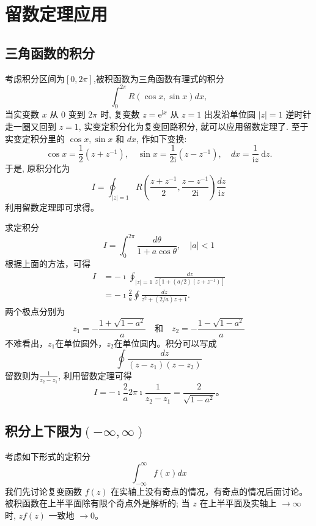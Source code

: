 \section{留数定理应用}
\subsection{三角函数的积分}
考虑积分区间为$\left[ 0, 2\pi \right]$,被积函数为三角函数有理式的积分
\begin{equation}
    \int_{0}^{2\pi} R(\cos{x}, \sin{x}) dx,
\end{equation}
当实变数 $x$ 从 0 变到 $2 \pi$ 时, 复变数 $z=\mathrm{e}^{\mathrm{i} x}$ 从 $z=1$ 出发沿单位圆 $|z|=1$ 逆时针 走一圈又回到 $z=1$,
实变定积分化为复变回路积分, 就可以应用留数定理了. 至于实变定积分里的 $\cos x, \sin x$ 和 $d x$, 作如下变换:
$$
\cos x=\frac{1}{2}\left(z+z^{-1}\right), \quad \sin x=\frac{1}{2 \mathrm{i}}\left(z-z^{-1}\right), \quad d x=\frac{1}{\mathrm{i} z} \mathrm{~d} z .
$$
于是, 原积分化为
$$
I=\oint_{|z|=1} R\left(\frac{z+z^{-1}}{2}, \frac{z-z^{-1}}{2 \mathrm{i}}\right) \frac{d z}{\mathrm{i} z}
$$
利用留数定理即可求得。

\begin{examplebox}{求定积分\[I=\int_0^{2 \pi} \frac{d \theta}{1+a \cos \theta}, \quad|a|<1 \]}
    根据上面的方法，可得
    \[
        \begin{aligned}
        I & =-\imath \oint_{|z|=1} \frac{d z}{z\left[1+(a / 2)\left(z+z^{-1}\right)\right]} \\
        & =-\imath \frac{2}{a} \oint \frac{d z}{z^2+(2 / a) z+1} .
        \end{aligned}
    \]
    两个极点分别为
    \[
        z_1=-\frac{1+\sqrt{1-a^2}}{a} \quad \text {和} \quad z_2=-\frac{1-\sqrt{1-a^2}}{a}
    \]
    不难看出，$z_1$在单位圆外，$z_2$在单位圆内。积分可以写成
    \[
      \oint \frac{dz}{(z-z_1)(z-z_2)}   
    \]
    留数则为$\frac{1}{z_2 - z_1}$, 利用留数定理可得 
    \[
      I=  -\imath \frac{2}{a} 2\pi\imath \frac{1}{z_2 - z_1} = \frac{2}{\sqrt{1 - a^2}} \textrm{。} 
    \]
\end{examplebox}



\subsection{积分上下限为$\left( -\infty, \infty \right)$}
 考虑如下形式的定积分
 \[
    \int_{-\infty}^{\infty} f(x) dx
 \]
 我们先讨论复变函数 $f(z)$ 在实轴上没有奇点的情况，有奇点的情况后面讨论。 
被积函数在上半平面除有限个奇点外是解析的; 当 $z$ 在上半平面及实轴上 $\to \infty$ 时, 
$z f(z)$ 一致地 $\to 0$。

